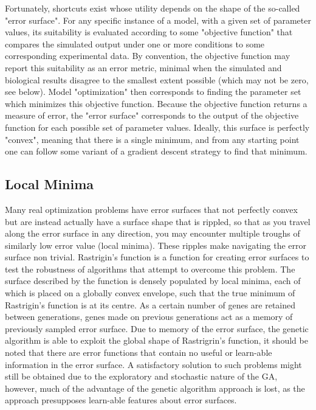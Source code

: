 Fortunately, shortcuts exist whose utility depends on the shape of the so-called "error surface".
For any specific instance of a model, with a given set of parameter values, its suitability is evaluated according to some "objective function" that compares the simulated output under one or more conditions to some corresponding experimental data.
By convention, the objective function may report this suitability as an error metric, minimal when the simulated and biological results disagree to the smallest extent possible (which may not be zero, see below).
Model "optimization" then corresponds to finding the parameter set which minimizes this objective function. 
Because the objective function returns a measure of error, the "error surface" corresponds to the output of the objective function for each possible set of parameter values.
Ideally, this surface is perfectly "convex", meaning that there is a single minimum, and from any starting point one can follow some variant of a gradient descent strategy to find that minimum.  

\subsection{Local Minima} Many real optimization problems have error surfaces that not perfectly convex but are instead actually have a surface shape that is rippled, so that as you travel along the error surface in any direction, you may encounter multiple troughs of similarly low error value (local minima).
These ripples make navigating the error surface non trivial.
Rastrigin's function \cite{rastrigin1974systems}  is a function for creating error surfaces to test the robustness of algorithms that attempt to overcome this problem.
The surface described by the function is densely populated by local minima, each of which is placed on a globally convex envelope, such that the true minimum of Rastrigin's function is at its centre. As a certain number of genes are retained between generations, genes made on previous generations act as a memory of previously sampled error surface. Due to memory of the error surface, the genetic algorithm is able to exploit the global shape of Rastrigrin's function, it should be noted that there are error functions that contain no useful or learn-able information in the error surface. A satisfactory solution to such problems might still be obtained due to the exploratory and stochastic nature of the GA, however, much of the advantage of the genetic algorithm approach is lost, as the approach presupposes learn-able features about error surfaces. 

